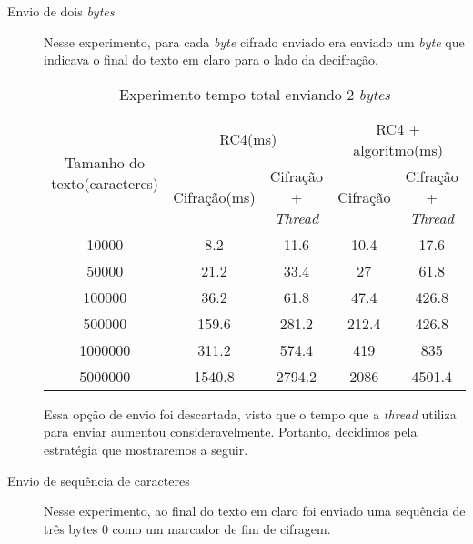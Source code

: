 \begin{description}
	\item [Envio de dois \textit{bytes}] Nesse experimento, para cada \textit{byte} cifrado enviado era enviado um \textit{byte} que indicava o final do texto em claro para o lado da decifração.
	
	\begin{table}[h]
\begin{tabular}{|c|c|c|c|c|}
\hline
\multirow{2}{3cm}{Tamanho do texto(caracteres)} & \multicolumn{2}{c|}{RC4(ms)}     & \multicolumn{2}{c|}{RC4 + algoritmo(ms)} \\ \cline{2-5} 
                                     & Cifração(ms) & Cifração + \textit{Thread} & Cifração     & Cifração + \textit{Thread}    \\ \hline
10000                                & 8.2      & 11.6              & 10.4         & 17.6                  \\ \hline
50000                                & 21.2     & 33.4              & 27           & 61.8                  \\ \hline
100000                               & 36.2     & 61.8              & 47.4         & 426.8                 \\ \hline
500000                               & 159.6    & 281.2             & 212.4        & 426.8                 \\ \hline
1000000                              & 311.2    & 574.4             & 419          & 835                   \\ \hline
5000000                              & 1540.8   & 2794.2            & 2086         & 4501.4                \\ \hline
\end{tabular}
\caption{Experimento tempo total enviando 2 \textit{bytes}}
\end{table}

Essa opção de envio foi descartada, visto que o tempo que a \textit{thread} utiliza para enviar aumentou consideravelmente. Portanto, decidimos pela estratégia que mostraremos a seguir.
	
	\item[Envio de sequência de caracteres] Nesse experimento, ao final do texto em claro foi enviado uma sequência de três bytes 0 como um marcador de fim de cifragem.
	

\end{description}
